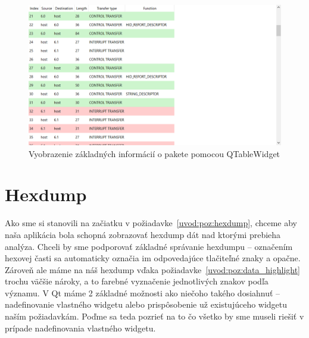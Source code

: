 \begin{figure}[!htb]
	\centering
	\includegraphics[width=\textwidth]{img/kap03_TableViewLookColor}
	\caption{Vyobrazenie základných informácií o pakete pomocou QTableWidget}
	\label{obr:kap3:TableViewLookColor}
\end{figure}



\section{Hexdump}
Ako sme si stanovili na začiatku v požiadavke~\ref{uvod:poz:hexdump}, chceme aby naša aplikácia bola schopná zobrazovať hexdump dát nad ktorými prebieha analýza. Chceli by sme podporovať základné správanie hexdumpu -- označením hexovej časti sa automaticky označia im odpovedajúce tlačiteľné znaky a opačne. Zároveň ale máme na náš hexdump vďaka požiadavke~\ref{uvod:poz:data_highlight} trochu väčšie nároky, a to farebné vyznačenie jednotlivých znakov podľa významu. V Qt máme 2 základné možnosti ako niečoho takého dosiahnuť -- nadefinovanie vlastného widgetu alebo prispôsobenie už existujúceho widgetu naším požiadavkám. Poďme sa teda pozrieť na to čo všetko by sme museli riešiť v prípade nadefinovania vlastného widgetu.

